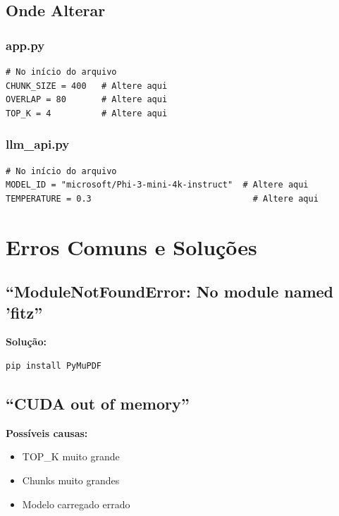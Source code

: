 \documentclass[12pt,a4paper]{article}
\begin{document}
\subsection{Onde Alterar}

\subsubsection{app.py}

\begin{lstlisting}
# No início do arquivo
CHUNK_SIZE = 400   # Altere aqui
OVERLAP = 80       # Altere aqui
TOP_K = 4          # Altere aqui
\end{lstlisting}

\subsubsection{llm\_api.py}

\begin{lstlisting}
# No início do arquivo
MODEL_ID = "microsoft/Phi-3-mini-4k-instruct"  # Altere aqui
TEMPERATURE = 0.3                                # Altere aqui
\end{lstlisting}

\section{Erros Comuns e Soluções}

\subsection{``ModuleNotFoundError: No module named 'fitz''}

\textbf{Solução:}
\begin{lstlisting}
pip install PyMuPDF
\end{lstlisting}

\subsection{``CUDA out of memory''}

\textbf{Possíveis causas:}
\begin{itemize}
    \item TOP\_K muito grande
    \item Chunks muito grandes
    \item Modelo carregado errado
\end{itemize}
\end{document}
